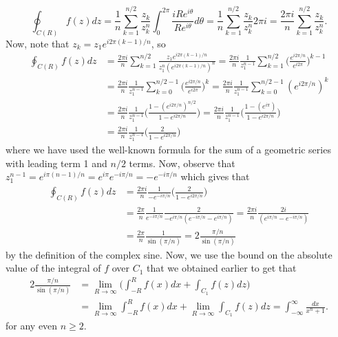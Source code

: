 \documentclass{article}
\begin{document}
\[
\oint_{C(R)} f(z)dz=\frac{1}{n}\sum_{k=1}^{n/2}\frac{z_k}{z_k^n}\int_0^{2\pi}\frac{iRe^{i\theta}}{Re^{i\theta}}d\theta=\frac{1}{n}\sum_{k=1}^{n/2}\frac{z_k}{z_k^n}2\pi i=\frac{2\pi i}{n}\sum_{k=1}^{n/2}\frac{z_k}{z_k^n}.
\]
Now, note that $z_k=z_1e^{i2\pi(k-1)/n}$, so 
\begin{align*}
\oint_{C(R)} f(z)dz&=\frac{2\pi i}{n}\sum_{k=1}^{n/2}\frac{z_1e^{i2\pi(k-1)/n}}{z_1^n(e^{i2\pi(k-1)/n})^n}=\frac{2\pi i}{n}\frac{1}{z_1^{n-1}}\sum_{k=1}^{n/2}\bigg(\frac{e^{i2\pi/n}}{e^{i2\pi}}\bigg)^{k-1}\\&=
\frac{2\pi i}{n}\frac{1}{z_1^{n-1}}\sum_{k=0}^{n/2-1}\bigg(\frac{e^{i2\pi/n}}{e^{i2\pi}}\bigg)^k=\frac{2\pi i}{n}\frac{1}{z_1^{n-1}}\sum_{k=0}^{n/2-1}(e^{i2\pi/n})^k\\&=
\frac{2\pi i}{n}\frac{1}{z_1^{n-1}}\bigg(\frac{1-(e^{i2\pi/n})^{n/2}}{1-e^{i2\pi/n}}\bigg)=\frac{2\pi i}{n}\frac{1}{z_1^{n-1}}\bigg(\frac{1-(e^{i\pi})}{1-e^{i2\pi/n}}\bigg)\\&=
\frac{2\pi i}{n}\frac{1}{z_1^{n-1}}\bigg(\frac{2}{1-e^{i2\pi/n}}\bigg)
\end{align*}
where we have used the well-known formula for the sum of a geometric series with leading term 1 and $n/2$ terms. Now, observe that $z_1^{n-1}=e^{i\pi(n-1)/n}=e^{i\pi}e^{-i\pi/n}=-e^{-i\pi/n}$ which gives that 
\begin{align*}
\oint_{C(R)} f(z)dz&= \frac{2\pi i}{n}\frac{1}{-e^{-i\pi/n}}\bigg(\frac{2}{1-e^{i2\pi/n}}\bigg)\\&=
\frac{2\pi }{n}\frac{1}{e^{-i\pi/n}}\frac{2}{-e^{i\pi/n}(e^{-i\pi/n}-e^{i\pi/n})}=\frac{2\pi i}{n}\frac{2i}{(e^{i\pi/n}-e^{-i\pi/n})}\\&=
\frac{2\pi}{n}\frac{1}{\sin(\pi/n)}=2\frac{\pi/n}{\sin(\pi/n)}
\end{align*}
by the definition of the complex sine. Now, we use the bound on the absolute value of the integral of $f$ over $C_1$ that we obtained earlier to get that   
\[
\begin{split}
2\frac{\pi/n}{\sin(\pi/n)}&=\lim_{R\to\infty}\bigg(\int_{-R}^Rf(x)dx+\int_{C_1} f(z)dz\bigg)\\&=
\lim_{R\to\infty}\int_{-R}^Rf(x)dx+\lim_{R\to\infty}\int_{C_1} f(z)dz=\int_{-\infty}^\infty \frac{dx}{x^n+1}.
\end{split}
\]
for any even $n\geq2$.
\end{document}
